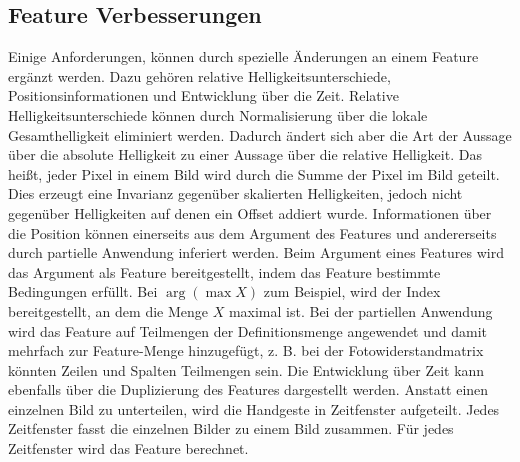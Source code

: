 \subsection{Feature Verbesserungen}
Einige Anforderungen, können durch spezielle Änderungen an einem Feature ergänzt werden. Dazu gehören relative Helligkeitsunterschiede, Positionsinformationen und Entwicklung über die Zeit.
\newline
\newline
Relative Helligkeitsunterschiede können durch Normalisierung über die lokale Gesamthelligkeit eliminiert werden. Dadurch ändert sich aber die Art der Aussage über die absolute Helligkeit
zu einer Aussage über die relative Helligkeit. Das heißt, jeder Pixel in einem Bild wird durch die Summe der Pixel im Bild geteilt. Dies erzeugt eine Invarianz gegenüber skalierten Helligkeiten,
jedoch nicht gegenüber Helligkeiten auf denen ein Offset addiert wurde.
\newline
\newline
Informationen über die Position können einerseits aus dem Argument des Features und andererseits durch partielle Anwendung inferiert werden. Beim Argument eines Features wird das Argument als Feature
bereitgestellt, indem das Feature bestimmte Bedingungen erfüllt. Bei $\arg(\max X)$ zum Beispiel, wird der Index bereitgestellt, an dem die Menge $X$ maximal ist. Bei der partiellen Anwendung wird das Feature auf
Teilmengen der Definitionsmenge angewendet und damit mehrfach zur Feature-Menge hinzugefügt, z. B. bei der Fotowiderstandmatrix könnten Zeilen und Spalten Teilmengen sein.
\newline
\newline
Die Entwicklung über Zeit kann ebenfalls über die Duplizierung des Features dargestellt werden. Anstatt einen einzelnen Bild zu unterteilen, wird die Handgeste in Zeitfenster aufgeteilt. Jedes Zeitfenster
fasst die einzelnen Bilder zu einem Bild zusammen. Für jedes Zeitfenster wird das Feature berechnet.